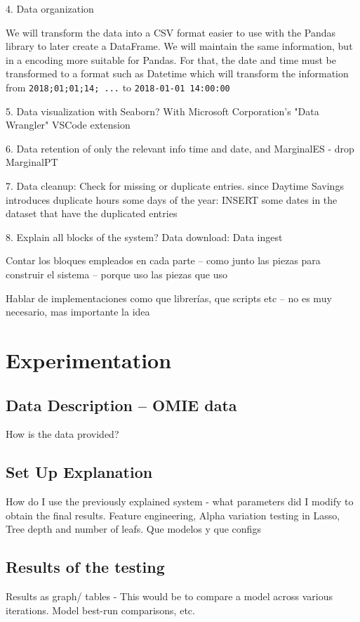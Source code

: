 \documentclass[12pt]{report} %
\begin{document}
4. Data organization

We will transform the data into a CSV format easier to use with the Pandas library to later create a DataFrame. We will maintain the same information, but in a encoding more suitable for Pandas. For that, the date and time must be transformed to a format such as Datetime which will transform the information from \texttt{2018;01;01;14; ...} to \texttt{2018-01-01 14:00:00}

5. Data visualization with Seaborn? With Microsoft Corporation's "Data Wrangler" VSCode extension

6. Data retention of only the relevant info time and date, and MarginalES - drop MarginalPT

7. Data cleanup:
Check for missing or duplicate entries. since Daytime Savings introduces duplicate hours some days of the year:
INSERT some dates in the dataset that have the duplicated entries

8. Explain all blocks of the system?
    Data download:
    Data ingest

Contar los bloques empleados en cada parte – como junto las piezas para construir el sistema – porque uso las piezas que uso

Hablar de implementaciones como que librerías, que scripts etc – no es muy necesario, mas importante la idea



\chapter{Experimentation}
\section{Data Description – OMIE data}
How is the data provided?

\section{Set Up Explanation}
How do I use the previously explained system - what parameters did I modify to obtain the final results. Feature engineering, Alpha variation testing in Lasso, Tree depth and number of leafs.
Que modelos y que configs

\section{Results of the testing}
Results as graph/ tables - This would be to compare a model across various iterations. Model best-run comparisons, etc.
\end{document}
